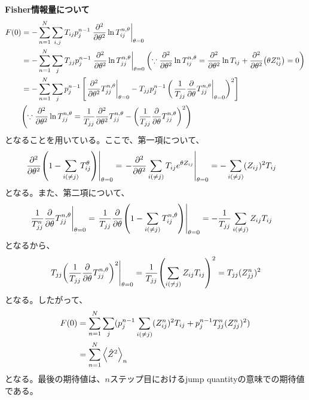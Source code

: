 \documentclass[a4paper,11pt]{jsarticle}
\numberwithin{equation}{section}
\begin{document}
\textbf{Fisher情報量について}\\
\begin{align}
    F(0) &= -\sum_{n=1}^{N} \sum_{i,j} T_{ij} p_j^{n-1} \eval{\frac{\partial^2}{\partial \theta^2} \ln T_{ij}^{n,\theta}}_{\theta=0} \\
    &= -\sum_{n=1}^{N} \sum_{j} T_{jj} p_j^{n-1} \eval{\frac{\partial^2}{\partial \theta^2} \ln T_{jj}^{n,\theta}}_{\theta=0} \qty(\because \pdv[2]{\theta}\ln{T_{ij}^{n,\theta}} = \pdv[2]{\theta} \ln T_{ij} + \pdv[2]{\theta} (\theta Z_{ij}^n) = 0)\\
    &= -\sum_{n=1}^{N} \sum_{j} p_j^{n-1} \left[
        \eval{\frac{\partial^2}{\partial \theta^2} T_{jj}^{n,\theta}}_{\theta=0}
        - T_{jj} p_j^{n-1} \left( \eval{\frac{1}{T_{jj}} \frac{\partial}{\partial \theta} T_{jj}^{n,\theta}}_{\theta=0} \right)^2
    \right]\\
    &\qty(\because \pdv[2]{\theta} \ln T_{jj}^{n,\theta} = \frac{1}{T_{jj}} \pdv[2]{\theta} T_{jj}^{n,\theta} - \qty(\frac{1}{T_{jj}} \pdv{\theta} T_{jj}^{n,\theta})^2)\\
\end{align}
となることを用いている。ここで、第一項について、
\begin{align}
    \left.\pdv[2]{\theta}(1-\sum_{i(\neq j)}T_{ij}^\theta)\right|_{\theta = 0} &= \left.-\pdv[2]{\theta}\sum_{i(\neq j)}T_{ij}e^{\theta Z_{ij}}\right|_{\theta = 0} = -\sum_{i(\neq j)}(Z_{ij})^2 T_{ij} 
\end{align}
となる。また、第二項について、
\begin{align}
    \left.\frac{1}{T_{jj}^n} \pdv{\theta} T_{jj}^{n,\theta}\right|_{\theta = 0} &=\left. \frac{1}{T_{jj}} \pdv{\theta} (1-\sum_{i(\neq j)}T_{ij}^{n,\theta})\right|_{\theta = 0} = -\frac{1}{T_{jj}} \sum_{i(\neq j)} Z_{ij} T_{ij}
\end{align}
となるから、
\begin{align}
    \left. T_{jj}\qty(\frac{1}{T_{jj}} \pdv{\theta} T_{jj}^{n,\theta})^2\right|_{\theta = 0} = \frac{1}{T_{jj}} \qty(\sum_{i(\neq j)} Z_{ij} T_{ij})^2 =T_{jj}(Z_{jj}^n)^2
\end{align}
となる。したがって、    
\begin{align}
    F(0) &= \sum_{n=1}^{N} \sum_{j} (p_j^{n-1} \sum_{i(\neq j)}(Z_{ij}^n)^2 T_{ij} + p_j^{n-1} T_{jj}^n (Z_{jj}^n)^2)\\
    &= \sum_{n=1}^{N} \ev{\hat{Z}^2}_n
\end{align}
となる。最後の期待値は、$n$ステップ目におけるjump quantityの意味での期待値である。\\
\end{document}
